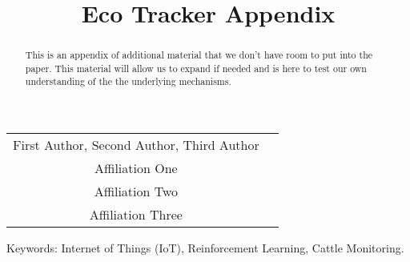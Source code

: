 \documentclass[10pt]{cai}
\begin{document}
\def\conferenceyear{2025}
\begin{center}

\title{Eco Tracker Appendix}
\maketitle

\thispagestyle{empty}

\begin{tabular}{cc}
First Author\upstairs{\affilone,*}, Second Author\upstairs{\affilone}, Third Author\upstairs{\affilthree}
\\[0.25ex]
{\small \upstairs{\affilone} Affiliation One} \\
{\small \upstairs{\affiltwo} Affiliation Two} \\
{\small \upstairs{\affilthree} Affiliation Three} \\
\end{tabular}
  
\vspace*{0.2in}
\end{center}

\begin{abstract}
This is an appendix of additional material that we don't have room to put into the paper.
This material will allow us to expand if needed and is here to test our own understanding of the the underlying mechanisms.

\end{abstract}

\begin{keywords}{Keywords:}
Internet of Things (IoT), Reinforcement Learning, Cattle Monitoring.
\end{keywords}
\copyrightnotice
\end{document}
